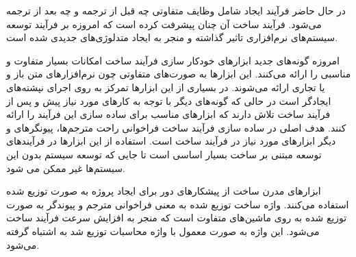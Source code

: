 در حال حاضر فرآیند ایجاد شامل وظایف متفاوتی چه قبل از ترجمه و چه بعد از ترجمه
می‌شود. فرآيند ساخت آن چنان پیشرفت کرده است که امروزه بر فرآیند توسعه سیستم‌های
نرم‌افزاری تاثیر گذاشته و منجر به ایجاد متدلوژی‌های جدیدی شده است.



امروزه گونه‌های جدید ابزارهای خودکار سازی فرآیند ساخت امکانات بسیار متفاوت و
مناسبی را ارائه می‌کنند.
این ابزارها به صورت‌های متفاوتی چون نرم‌افزارهای متن باز و یا تجاری ارائه
می‌شوند.
در بسیاری از این ابزارها تمرکز به روی اجرای نپشته‌های ایجادگر است در حالی که
گونه‌های دیگر با توجه به کارهای مورد نیاز پیش و پس از فرآیند ساخت تلاش دارند که
ابزارهای مناسب برای ساده سازی این فرآیند را ارائه کنند. هدف اصلی در ساده سازی
فرآیند ساخت فراخوانی راحت مترجم‌ها، پیونگرهای و دیگر ابزارهای مورد نیاز در
فرآیند ساخت است.
استفاده از این ابزارها در فرآیندهای توسعه مبتنی بر ساخت بسیار اساسی است تا جایی که توسعه سیستم بدون این سیستم‌ها غیر ممکن
می شود.



ابزارهای مدرن ساخت از پیشکارهای دور برای ایجاد پروژه به صورت
توزیع شده استفاده می‌کنند. واژه ساخت توزیع شده به معنی فراخوانی مترجم و پیوندگر به صورت توزیع شده به روی ماشین‌های
متفاوت است که منجر به افزایش سرعت فرآیند ساخت می‌شود.
این واژه به صورت معمول با واژه محاسبات توزیع شد به اشتباه گرفته می‌شود.

